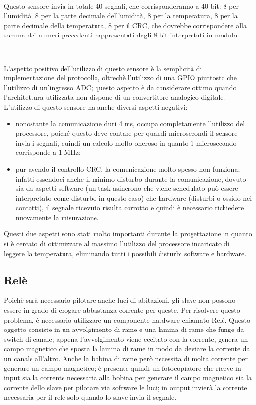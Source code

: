 \documentclass[a4paper,titlepage]{book}
\newcommand{\itema}{\begin{itemize}[noitemsep,topsep=10pt,parsep=5pt,partopsep=10pt]}
\begin{document}
~

Questo sensore invia in totale 40 segnali, che corrisponderanno a 40 bit: 8 per l'umidità, 8 per la parte decimale dell'umidità, 8 per la temperatura, 8 per la parte decimale della temperatura, 8 per il CRC, che dovrebbe corrispondere alla somma dei numeri precedenti rappresentati dagli 8 bit interpretati in modulo.

~

L'aspetto positivo dell'utilizzo di questo sensore è la semplicità di implementazione del protocollo, oltrechè l'utilizzo di una GPIO piuttosto che l'utilizzo di un'ingresso ADC; questo aspetto è da considerare ottimo quando l'architettura utilizzata non dispone di un convertitore analogico-digitale. L'utilizzo di questo sensore ha anche diversi aspetti negativi:

\itema

\item nonostante la comunicazione duri 4 ms, occupa completamente l'utilizzo del processore, poiché questo deve contare per quandi microsecondi il sensore invia i segnali, quindi un calcolo molto oneroso in quanto 1 microsecondo corrisponde a 1 MHz;

\item pur avendo il controllo CRC, la comunicazione molto spesso non funziona; infatti essendoci anche il minimo disturbo durante la comunicazione, dovuto sia da aspetti software (un task asincrono che viene schedulato può essere interpretato come disturbo in questo caso) che hardware (disturbi o ossido nei contatti), il segnale ricevuto risulta corrotto e quindi è necessario richiedere nuovamente la misurazione. 

\end{itemize}

Questi due aspetti sono stati molto importanti durante la progettazione in quanto si è cercato di ottimizzare al massimo l'utilizzo del processore incaricato di leggere la temperatura, eliminando tutti i possibili disturbi software e hardware.

\subsection{Relè}

Poichè sarà necessario pilotare anche luci di abitazioni, gli slave non possono essere in grado di erogare abbastanza corrente per queste. Per risolvere questo problema, è necessario utilizzare un componente hardware chiamato Relè. Questo oggetto consiste in un avvolgimento di rame e una lamina di rame che funge da switch di canale; appena l'avvolgimento viene eccitato con la corrente, genera un campo magnetico che sposta la lamina di rame in modo da deviare la corrente da un canale all'altro. Anche la bobina di rame però necessita di molta corrente per generare un campo magnetico; è presente quindi un fotocopiatore che riceve in input sia la corrente necessaria alla bobina per generare il campo magnetico sia la corrente dello slave per pilotare via software le luci; in output invierà la corrente necessaria per il relé solo quando lo slave invia il segnale.
\end{document}
